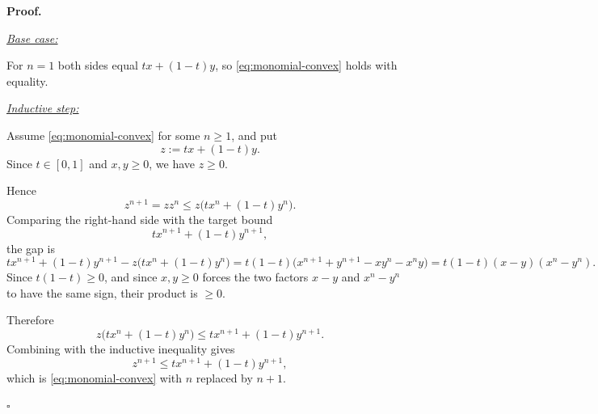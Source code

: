 \documentclass[11pt,reqno]{amsart}
\theoremstyle{redplain}
\renewcommand{\qedsymbol}{\textcolor{proofqed}{\ensuremath{\square}}}
\renewenvironment{proof}[1][Proof]{\par\noindent\textbf{\textcolor{proofhead}{#1.}}\par\nobreak}{\par\nobreak\hfill\qedsymbol}
\numberwithin{equation}{section}
\begin{document}
\begin{proof}
\noindent\underline{{\large \emph{Base case:}}}

\noindent For $n=1$ both sides equal $tx+(1-t)y$, so %
\cref{eq:monomial-convex} holds with equality.

\noindent\underline{{\large \emph{Inductive step:}}}

\noindent Assume \cref{eq:monomial-convex} for some $n\geq 1$, and put 
\begin{equation*}
z:=tx+(1-t)y.
\end{equation*}
Since $t\in [0,1]$ and $x,y\geq 0$, we have $z\geq 0$.

Hence 
\begin{equation*}
z^{n+1}=zz^{n}\leq z\bigl(tx^{n}+(1-t)y^{n}\bigr).
\end{equation*}%
Comparing the right-hand side with the target bound 
\begin{equation*}
tx^{n+1}+(1-t)y^{n+1},
\end{equation*}%
the gap is 
\begin{equation*}
tx^{n+1}+(1-t)y^{n+1}-z\bigl(tx^{n}+(1-t)y^{n}\bigr)=t(1-t)\bigl(%
x^{n+1}+y^{n+1}-xy^{n}-x^{n}y\bigr)=t(1-t)(x-y)(x^{n}-y^{n}).
\end{equation*}%
Since $t(1-t)\geq 0$, and since $x,y\geq 0$ forces the two factors $x-y$ and 
$x^{n}-y^{n}$ to have the same sign, their product is $\geq 0$.

Therefore 
\begin{equation*}
z\bigl(tx^{n}+(1-t)y^{n}\bigr)\leq tx^{n+1}+(1-t)y^{n+1}.
\end{equation*}%
Combining with the inductive inequality gives 
\begin{equation*}
z^{n+1}\leq tx^{n+1}+(1-t)y^{n+1},
\end{equation*}%
which is \cref{eq:monomial-convex} with $n$ replaced by $n+1$.
\end{proof}
\end{document}
